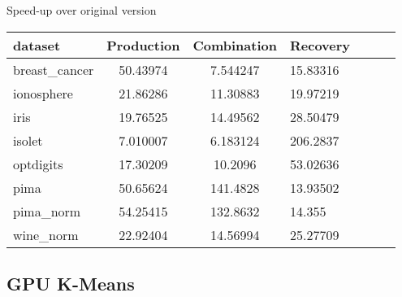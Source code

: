 \begin{frame}{Speed-up over original version}

\centering
\scriptsize

\begin{tabular}{lccllll}
\toprule
dataset & Production & Combination & Recovery \\
\midrule
breast\_cancer &     50.43974 &   7.544247 &        15.83316 \\
ionosphere    &      21.86286 &   11.30883 &        19.97219 \\
iris          &     19.76525 &   14.49562 &        28.50479 \\
isolet        &    7.010007 &   6.183124 &        206.2837 \\
optdigits     &   17.30209 &    10.2096 &        53.02636 \\
pima          &     50.65624 &   141.4828 &        13.93502 \\
pima\_norm     &     54.25415 &   132.8632 &          14.355 \\
wine\_norm     &      22.92404 &   14.56994 &        25.27709 \\
\bottomrule
\end{tabular}

\end{frame}


\subsection{GPU K-Means}

\begin{frame}{GPU K-Means}

\begin{center}
  \texttt{[image: \{\{2\_0]}}}
\end{center}

\end{frame}


\begin{frame}{GPU K-Means}

\begin{center}
  \texttt{[image: \{\{200\_0]}}}
\end{center}

\end{frame}


